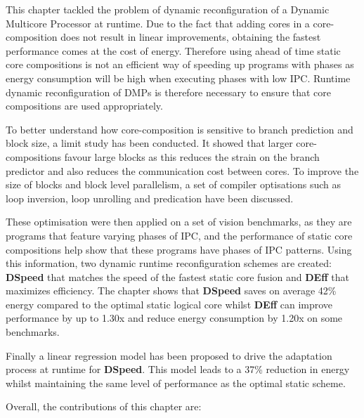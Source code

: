 This chapter tackled the problem of dynamic reconfiguration of a Dynamic Multicore Processor at runtime.
Due to the fact that adding cores in a core-composition does not result in linear improvements, obtaining the fastest performance comes at the cost of energy.
Therefore using ahead of time static core compositions is not an efficient way of speeding up programs with phases as energy consumption will be high when executing phases with low IPC. %
Runtime dynamic reconfiguration of DMPs is therefore necessary to ensure that core compositions are used appropriately.

To better understand how core-composition is sensitive to branch prediction and block size, a limit study has been conducted.
It showed that larger core-compositions favour large blocks as this reduces the strain on the branch predictor and also reduces the communication cost between cores.
To improve the size of blocks and block level parallelism, a set of compiler optisations such as loop inversion, loop unrolling and predication have been discussed.

These optimisation were then applied on a set of vision benchmarks, as they are programs that feature varying phases of IPC, and the performance of static core compositions help show that these programs have phases of IPC patterns.
Using this information, two dynamic runtime reconfiguration schemes are created:  \textbf{DSpeed} that matches the speed of the fastest static core fusion and \textbf{DEff} that maximizes efficiency.
The chapter shows that \textbf{DSpeed} saves on average 42\% energy compared to the optimal static logical core whilst \textbf{DEff} can improve performance by up to 1.30x and reduce energy consumption by 1.20x on some benchmarks.

Finally a linear regression model has been proposed to drive the adaptation process at runtime for \textbf{DSpeed}.
This  model leads to a 37\% reduction in energy whilst maintaining the same level of performance as the optimal static scheme.

Overall, the contributions of this chapter are:

